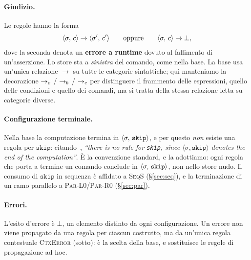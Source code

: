 \paragraph{Giudizio.} Le regole hanno la forma
\[
\cfg{c}{\sigma} \to \cfg{c'}{\sigma'}
\qquad\text{oppure}\qquad
\cfg{c}{\sigma} \to \bot ,
\]
dove la seconda denota un \textbf{errore a runtime} dovuto al fallimento di
un'asserzione. Lo store sta a \emph{sinistra} del comando, come nella base.
La base usa un'unica relazione $\to$ su tutte le categorie sintattiche; qui
manteniamo la decorazione $\toe$ / $\tob$ / $\toc$ per distinguere il
frammento delle espressioni, quello delle condizioni e quello dei comandi,
ma si tratta della stessa relazione letta su categorie diverse.

\paragraph{Configurazione terminale.} Nella base la computazione termina in
$\cfg{\mathtt{skip}}{\sigma}$, e per questo \emph{non} esiste una regola per
$\mathtt{skip}$: citando~\cite{LamiLaneseStefani2024}, \emph{``there is no
rule for \textup{\texttt{skip}}, since $\langle \sigma, \mathtt{skip}\rangle$
denotes the end of the computation''}. È la convenzione standard, e la
adottiamo: ogni regola che porta a termine un comando conclude in
$\cfg{\mathtt{skip}}{\sigma}$, non nello store nudo. Il consumo di
$\mathtt{skip}$ in sequenza è affidato a \textsc{SeqS} (\S\ref{sec:seq}), e
la terminazione di un ramo parallelo a \textsc{Par-L0}/\textsc{Par-R0}
(\S\ref{sec:par}).

\paragraph{Errori.} L'esito d'errore è $\bot$, un elemento distinto da ogni
configurazione. Un errore non viene propagato da una regola per ciascun
costrutto, ma da un'unica regola contestuale \textsc{CtxError} (sotto): è la
scelta della base, e sostituisce le regole di propagazione ad hoc.

